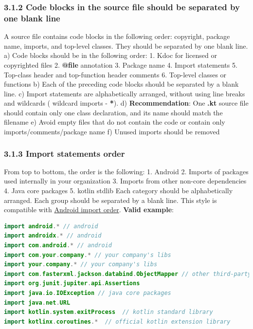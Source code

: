 \subsubsection*{\textbf{3.1.2 Code blocks in the source file should be separated by one blank line}}
\leavevmode\newline
\label{sec:3.1.2}
A source file contains code blocks in the following order: copyright, package name, imports, and top-level classes. They should be separated by one blank line.
a) Code blocks should be in the following order:
1.	Kdoc for licensed or copyrighted files
2.	\textbf{@file} annotation
3.	Package name
4.	Import statements
5.	Top-class header and top-function header comments
6.	Top-level classes or functions
b) Each of the preceding code blocks should be separated by a blank line. 
c) Import statements are alphabetically arranged, without using line breaks and wildcards ( wildcard imports - \textbf{*}). 
d) \textbf{Recommendation}: One \textbf{.kt} source file should contain only one class declaration, and its name should match the filename
e) Avoid empty files that do not contain the code or contain only imports/comments/package name
f) Unused imports should be removed
\subsubsection*{\textbf{3.1.3 Import statements order}}
\leavevmode\newline
\label{sec:3.1.3}
From top to bottom, the order is the following:
1. Android
2. Imports of packages used internally in your organization
3. Imports from other non-core dependencies
4. Java core packages
5. kotlin stdlib
Each category should be alphabetically arranged. Each group should be separated by a blank line. This style is compatible with  \href{https://source.android.com/setup/contribute/code-style#order-import-statements}{Android import order}.
\textbf{Valid example}:
\begin{lstlisting}[language=Kotlin]
import android.* // android
import androidx.* // android
import com.android.* // android
import com.your.company.* // your company's libs
import your.company.* // your company's libs
import com.fasterxml.jackson.databind.ObjectMapper // other third-party dependencies
import org.junit.jupiter.api.Assertions
import java.io.IOException // java core packages
import java.net.URL
import kotlin.system.exitProcess  // kotlin standard library
import kotlinx.coroutines.*  // official kotlin extension library
\end{lstlisting}
